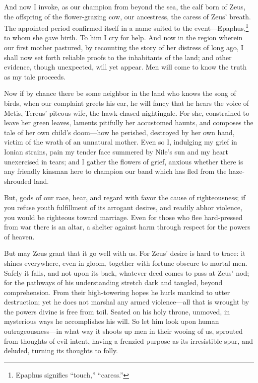 \documentclass[12pt]{article}
\begin{document}
And now I invoke, as our champion from beyond the sea, the calf born of Zeus, the offspring of the flower-grazing cow, our ancestress, the caress of Zeus' breath. The appointed period confirmed itself in a name suited to the event---Epaphus,\footnote{Epaphus signifies ``touch,'' ``caress.''} to whom she gave birth. To him I cry for help. And now in the region wherein our first mother pastured, by recounting the story of her distress of long ago, I shall now set forth reliable proofs to the inhabitants of the land; and other evidence, though unexpected, will yet appear. Men will come to know the truth as my tale proceeds.

Now if by chance there be some neighbor in the land who knows the song of birds, when our complaint greets his ear, he will fancy that he hears the voice of Metis, Tereus' piteous wife, the hawk-chased nightingale. For she, constrained to leave her green leaves, laments pitifully her accustomed haunts, and composes the tale of her own child's doom---how he perished, destroyed by her own hand, victim of the wrath of an unnatural mother. Even so I, indulging my grief in Ionian strains, pain my tender face summered by Nile's sun and my heart unexercised in tears; and I gather the flowers of grief, anxious whether there is any friendly kinsman here to champion our band which has fled from the haze-shrouded land.

But, gods of our race, hear, and regard with favor the cause of righteousness; if you refuse youth fulfillment of its arrogant desires, and readily abhor violence, you would be righteous toward marriage. Even for those who flee hard-pressed from war there is an altar, a shelter against harm through respect for the powers of heaven.

But may Zeus grant that it go well with us. For Zeus' desire is hard to trace: it shines everywhere, even in gloom, together with fortune obscure to mortal men. Safely it falls, and not upon its back, whatever deed comes to pass at Zeus' nod; for the pathways of his understanding stretch dark and tangled, beyond comprehension. From their high-towering hopes he hurls mankind to utter destruction; yet he does not marshal any armed violence---all that is wrought by the powers divine is free from toil. Seated on his holy throne, unmoved, in mysterious ways he accomplishes his will. So let him look upon human outrageousness---in what way it shoots up men in their wooing of us, sprouted from thoughts of evil intent, having a frenzied purpose as its irresistible spur, and deluded, turning its thoughts to folly.
\end{document}
